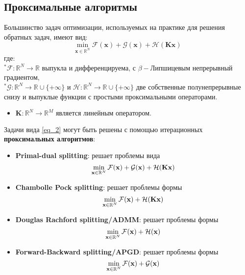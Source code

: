 \documentclass[a4paper,12pt]{article}
\theoremstyle{plain}
\theoremstyle{definition}
\theoremstyle{remark}
\begin{document}
\subsection{Проксимальные алгоритмы}
Большинство задач оптимизации, 
используемых на практике для решения обратных задач, имеют вид:
\begin{equation}
\label{eq_2}
\min_{\textbf{x} \in \mathbb{R}^N}
\mathcal{F}(\textbf{x})
+ \mathcal{G}(\textbf{x})
+ \mathcal{H}(\textbf{Kx})
\end{equation}
где:\\ 
${}^*\mathcal{F}: \mathbb{R}^N \rightarrow \mathbb{R}$
выпукла и дифференцируема, 
с $\beta-$Липшицевым непрерывный градиентом,\\
${}^*\mathcal{G}: 
\mathbb{R}^N \rightarrow \mathbb{R} \cup \{ +\infty \}$
и 
$\mathcal{H}: 
\mathbb{R}^N \rightarrow \mathbb{R} \cup \{ +\infty \}$
две собственные полунепрерывные снизу и 
выпуклые функции с простыми проксимальными операторами.
\begin{itemize}
\item 
$\textbf{K}: 
\mathbb{R}^N \rightarrow \mathbb{R}^M$
является линейным оператором. 
\end{itemize}
Задачи вида \eqref{eq_2} могут быть решены 
с помощью итерационных \textbf{проксимальных алгоритмов}:
\begin{itemize}
\item
\textbf{Primal-dual splitting}:
решает проблемы вида
\[
\min_{\textbf{x}\in \mathbb{R}^N}
\mathcal{F}(\textbf{\textbf{x}}) +
\mathcal{G}(\textbf{\textbf{x}}) +
\mathcal{H}(\textbf{\textbf{Kx}})
\]
\item
\textbf{Chambolle Pock splitting}:
решает проблемы формы
\[
\min_{\textbf{x}\in \mathbb{R}^N}
\mathcal{F}(\textbf{\textbf{x}}) +
\mathcal{H}(\textbf{\textbf{Kx}})
\]
\item
\textbf{Douglas Rachford splitting/ADMM}:
решает проблемы формы
\[
\min_{\textbf{x}\in \mathbb{R}^N}
\mathcal{F}(\textbf{\textbf{x}}) +
\mathcal{H}(\textbf{\textbf{x}})
\]
\item
\textbf{Forward-Backward splitting/APGD}:
решает проблемы формы
\[
\min_{\textbf{x}\in \mathbb{R}^N}
\mathcal{F}(\textbf{\textbf{x}}) +
\mathcal{G}(\textbf{\textbf{x}})
\]
\end{itemize}
\end{document}
